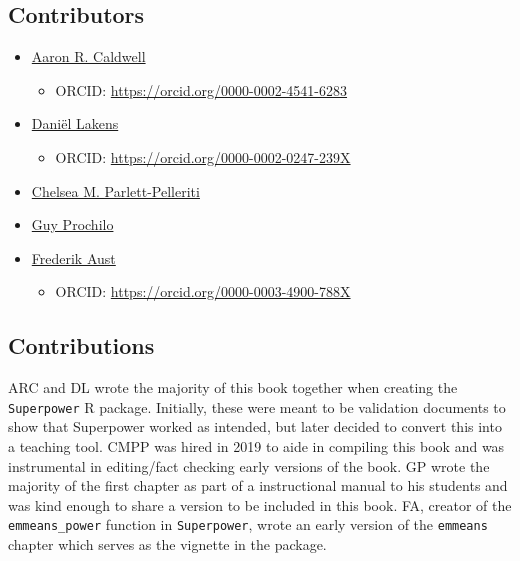 \documentclass[
]{book}
\providecommand{\tightlist}{%
  \setlength{\itemsep}{0pt}\setlength{\parskip}{0pt}}
\begin{document}
\hypertarget{contributors}{%
\subsection*{Contributors}\label{contributors}}

\begin{itemize}
\tightlist
\item
  \href{https://aaroncaldwell.us}{Aaron R. Caldwell}

  \begin{itemize}
  \tightlist
  \item
    ORCID: \url{https://orcid.org/0000-0002-4541-6283}
  \end{itemize}
\item
  \href{https://sites.google.com/site/lakens2/}{Daniël Lakens}

  \begin{itemize}
  \tightlist
  \item
    ORCID: \url{https://orcid.org/0000-0002-0247-239X}
  \end{itemize}
\item
  \href{https://cmparlettpelleriti.github.io/}{Chelsea M. Parlett-Pelleriti}
\item
  \href{http://www.guyprochilo.com/}{Guy Prochilo}
\item
  \href{http://frederikaust.com/}{Frederik Aust}

  \begin{itemize}
  \tightlist
  \item
    ORCID: \url{https://orcid.org/0000-0003-4900-788X}
  \end{itemize}
\end{itemize}

\hypertarget{contributions}{%
\subsection*{Contributions}\label{contributions}}

ARC and DL wrote the majority of this book together when creating the \texttt{Superpower} R package. Initially, these were meant to be validation documents to show that Superpower worked as intended, but later decided to convert this into a teaching tool. CMPP was hired in 2019 to aide in compiling this book and was instrumental in editing/fact checking early versions of the book. GP wrote the majority of the first chapter as part of a instructional manual to his students and was kind enough to share a version to be included in this book. FA, creator of the \texttt{emmeans\_power} function in \texttt{Superpower}, wrote an early version of the \texttt{emmeans} chapter which serves as the vignette in the package.
\end{document}
